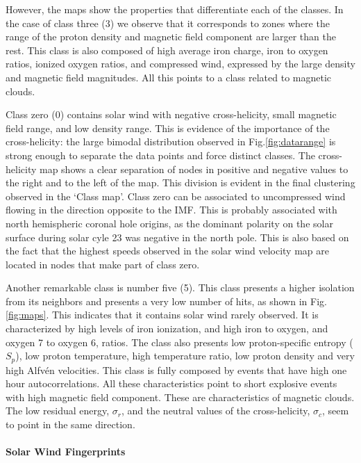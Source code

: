 However, the maps show the properties that differentiate each of the classes. In the case of class three (3) we observe that it corresponds to zones where the range of the proton density and magnetic field component are larger than the rest. This class is also composed of high average iron charge, iron to oxygen ratios, ionized oxygen ratios, and compressed wind, expressed by the large density and magnetic field magnitudes. All this points to a class related to magnetic clouds.

Class zero (0) contains solar wind with negative cross-helicity, small magnetic field range, and low density range. This is evidence of the importance of the cross-helicity: the large bimodal distribution observed in Fig.\ref{fig:datarange} is strong enough to separate the data points and force distinct classes. The cross-helicity map shows a clear separation of nodes in positive and negative values to the right and to the left of the map. This division is evident in the final clustering observed in the `Class map'. Class zero can be associated to uncompressed wind flowing in the direction opposite to the IMF. This is probably associated with north hemispheric coronal hole origins, as the dominant polarity on the solar surface during solar cyle 23 was negative in the north pole. This is also based on the fact that the highest speeds observed in the solar wind velocity map are located in nodes that make part of class zero.

Another remarkable class is number five (5). This class presents a higher isolation from its neighbors and presents a very low number of hits, as shown in Fig.\ref{fig:maps}. This indicates that it contains solar wind rarely observed. It is characterized by high levels of iron ionization, and high iron to oxygen, and oxygen 7 to oxygen 6, ratios. The class also presents low proton-specific entropy ($S_p$), low proton temperature, high temperature ratio, low proton density and very high Alfv\'en velocities. This class is fully composed by events that have high one hour autocorrelations. All these characteristics point to short explosive events with high magnetic field component. These are characteristics of magnetic clouds. The low residual energy, $\sigma_r$, and the neutral values of the cross-helicity, $\sigma_c$, seem to point in the same direction.

\paragraph{Solar Wind Fingerprints}

